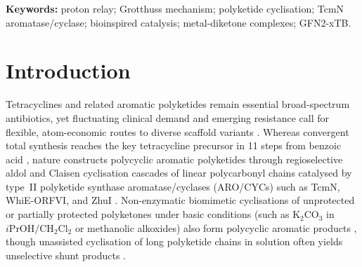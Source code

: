 \documentclass[11pt,a4paper]{article}
\begin{document}
\noindent\textbf{Keywords:} proton relay; Grotthuss mechanism; polyketide cyclisation; TcmN aromatase/cyclase; bioinspired catalysis; metal-diketone complexes; GFN2-xTB.

\section{Introduction}
Tetracyclines and related aromatic polyketides remain essential broad-spectrum antibiotics, yet fluctuating clinical demand and emerging resistance call for flexible, atom-economic routes to diverse scaffold variants \cite{myers2005sci,myers2005jacs}. Whereas convergent total synthesis reaches the key tetracycline precursor in 11 steps from benzoic acid \cite{myers2001,myers2005sci}, nature constructs polycyclic aromatic polyketides through regioselective aldol and Claisen cyclisation cascades of linear polycarbonyl chains catalysed by type~II polyketide synthase aromatase/cyclases (ARO/CYCs) such as TcmN, WhiE-ORFVI, and ZhuI \cite{shen1995,shen1996,ames2008,zhou2010,ames2011,lee2012,caldara2015}. Non-enzymatic biomimetic cyclisations of unprotected or partially protected polyketones under basic conditions (such as $\text{K}_2\text{CO}_3$ in $i\text{PrOH}/\text{CH}_2\text{Cl}_2$ or methanolic alkoxides) also form polycyclic aromatic products \cite{harris1975,hayat1999,krohn1999,krohn2000,krohn2002,barrett2018,barrett2019,sparr2020}, though unassisted cyclisation of long polyketide chains in solution often yields unselective shunt products \cite{shen1995,shen1996}.
\end{document}
